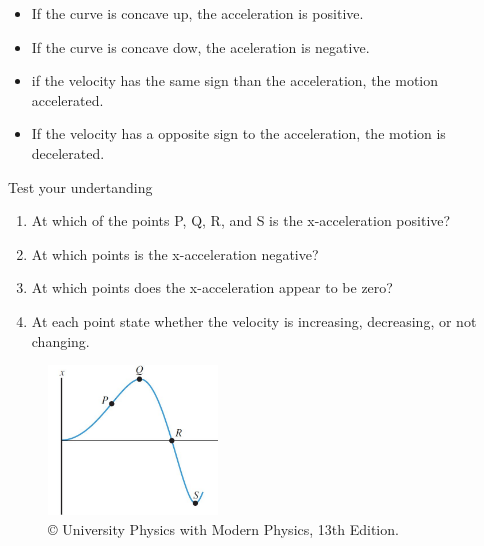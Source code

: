 \documentclass[]{beamer}
\begin{document}




\begin{frame}

\begin{itemize}
\item If the curve is concave up, the acceleration is positive.
\pause
\item If the curve is concave dow, the aceleration is negative.
\pause
\item if the velocity has the same sign than the acceleration, the motion accelerated.
\pause
\item If the velocity has a opposite sign to the acceleration, the motion is decelerated.
\end{itemize}

 \end{frame}


\begin{frame}
Test your undertanding
\vspace{3mm}

   \begin{enumerate}
\item At which of the points P, Q, R, and S is the
x-acceleration positive?
\item At which points is the x-acceleration negative?
\item  At which points does the x-acceleration appear to be zero? 
\item At each point state
whether the velocity is increasing, decreasing, or not changing.

\end{enumerate}
   
   \begin{figure}[h!]   
   \includegraphics[width=0.4\textwidth]{images/10.jpg}
   \caption{ {\tiny © University Physics 
   with Modern Physics, 13th Edition.} }
\end{figure}

 \end{frame}
\end{document}
